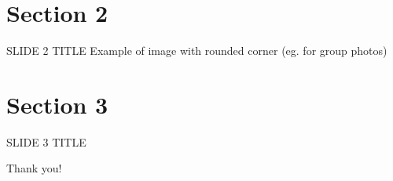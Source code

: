 \documentclass[10pt,xcolor={dvipsnames},aspectratio=169]{beamer}
\begin{document}
\section{Section 2}

\begin{frame}{SLIDE 2 TITLE}
  \center Example of image with rounded corner (eg. for group photos)

\end{frame}

\section{Section 3}

\begin{frame}{SLIDE 3 TITLE}
\end{frame}

\begin{frame}
  Thank you!
\end{frame}



%  
\end{document}
